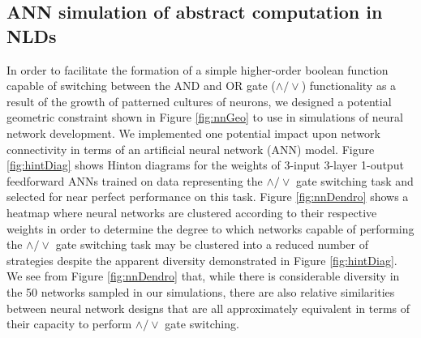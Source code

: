 \subsection{ANN simulation of abstract computation in NLDs}
In order to facilitate the formation of a simple higher-order boolean function capable of switching between the AND and OR gate ($\wedge / \vee$) functionality as a result of the growth of patterned cultures of neurons, we designed a potential geometric constraint shown in Figure \ref{fig:nnGeo} to use in simulations of neural network development. We implemented one potential impact upon network connectivity in terms of an artificial neural network (ANN) model. Figure \ref{fig:hintDiag} shows Hinton diagrams for the weights of 3-input 3-layer 1-output feedforward ANNs trained on data representing the $\wedge / \vee$ gate switching task and selected for near perfect performance on this task. Figure \ref{fig:nnDendro} shows a heatmap where neural networks are clustered according to their respective weights in order to determine the degree to which networks capable of performing the $\wedge / \vee$ gate switching task may be clustered into a reduced number of strategies despite the apparent diversity demonstrated in Figure \ref{fig:hintDiag}. We see from Figure \ref{fig:nnDendro} that, while there is considerable diversity in the 50 networks sampled in our simulations, there are also relative similarities between neural network designs that are all approximately equivalent in terms of their capacity to perform $\wedge / \vee$ gate switching.


